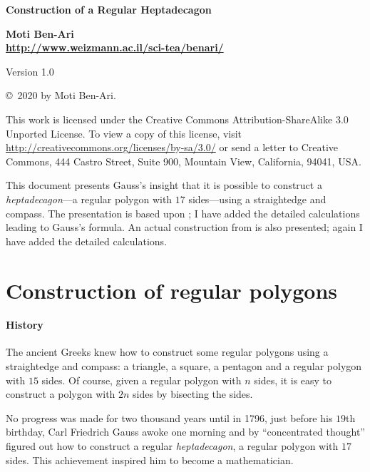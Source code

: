 \documentclass[11pt,a4paper]{article}
\begin{document}
\thispagestyle{empty}
\begin{center}
\textbf{\LARGE Construction of a Regular Heptadecagon}

\bigskip

\textbf{\Large Moti Ben-Ari\\\bigskip\url{http://www.weizmann.ac.il/sci-tea/benari/}}

\smallskip

Version 1.0

\medskip
\end{center}


\begin{footnotesize}
\begin{center}
\copyright{}\  2020 by Moti Ben-Ari. 
\end{center}
This work is licensed under the Creative Commons Attribution-ShareAlike 3.0 Unported License. To view a copy of this license, visit \url{http://creativecommons.org/licenses/by-sa/3.0/} or send a letter to Creative Commons, 444 Castro Street, Suite 900, Mountain View, California, 94041, USA.

\end{footnotesize}

This document presents Gauss's insight that it is possible to construct a \emph{heptadecagon}---a regular polygon with $17$ sides---using a straightedge and compass. The presentation is based upon \cite{jorg}; I have added the detailed calculations leading to Gauss's formula. An actual construction from \cite{callagy} is also presented; again I have added the detailed calculations.

\section{Construction of regular polygons}

\paragraph{History}
The ancient Greeks knew how to construct some regular polygons using a straightedge and compass: a triangle, a square, a pentagon and a regular polygon with $15$ sides. Of course, given a regular polygon with $n$ sides, it is easy to construct a polygon with $2n$ sides by bisecting the sides.

No progress was made for two thousand years until in 1796, just before his $19$th birthday, Carl Friedrich Gauss awoke one morning and by ``concentrated thought'' figured out how to construct a regular \emph{heptadecagon}, a regular polygon with $17$ sides. This achievement inspired him to become a mathematician.
\end{document}
